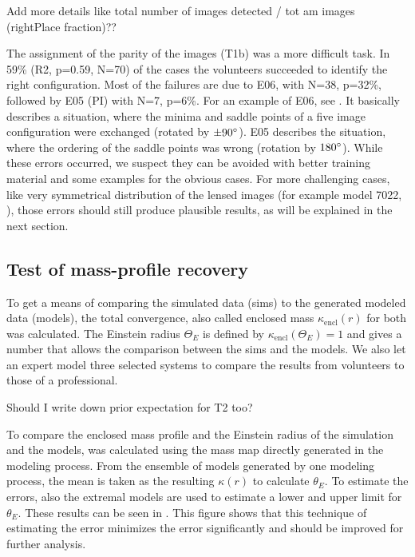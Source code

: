  Add more details like total number of images detected / tot am images (rightPlace fraction)??

The assignment of the parity of the images (T1b) was a more difficult task.
In 59\% (R2, p=0.59, N=70) of the cases the volunteers succeeded to identify the right configuration.
Most of the failures are due to E06, with N=38, p=32\%, followed by E05 (PI) with N=7, p=6\%.
For an example of E06, see .
It basically describes a situation, where the minima and saddle points of a five image configuration were exchanged (rotated by $\pm90^{\circ}$).
E05 describes the situation, where the ordering of the saddle points was wrong (rotation by $180^{\circ}$).
While these errors occurred, we suspect they can be avoided with better training material and some examples for the obvious cases.
For more challenging cases, like very symmetrical distribution of the lensed images (for example model 7022, ), those errors should still produce plausible results, as will be explained in the next section.



\subsection{Test of mass-profile recovery} \label{sec:tests.t2}

To get a means of comparing the simulated data (sims) to the generated modeled data (models), the total convergence, also called enclosed mass $\kappa_{\text{encl}}(r)$ for both was calculated.
The Einstein radius $\Theta_E$ is defined by $\kappa_{\text{encl}}(\Theta_E)=1$ and gives a number that allows the comparison between the sims and the models.
We also let an expert model three selected systems to compare the results from volunteers to those of a professional.

\todo{!} Should I write down prior expectation for T2 too?


To compare the enclosed mass profile and the Einstein radius of the simulation and the models, \kenc was calculated using the mass map \kap[x,y] directly generated in the modeling process.
From the ensemble of models generated by one modeling process, the mean is taken as the resulting $\kappa(r)$ to calculate $\theta_E$.
To estimate the errors, also the extremal models are used to estimate a lower and upper limit for $\theta_E$.
These results can be seen in .
This figure shows that this technique of estimating the error minimizes the error significantly and should be improved for further analysis.



